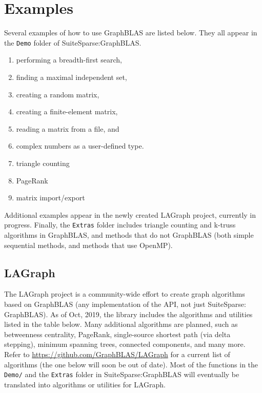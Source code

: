 \documentclass[12pt]{article}
\begin{document}
\newpage
\section{Examples} %
\label{examples}

Several examples of how to use GraphBLAS are listed below.  They all
appear in the \verb'Demo' folder of SuiteSparse:GraphBLAS.

\begin{enumerate}
\item performing a breadth-first search,
\item finding a maximal independent set,
\item creating a random matrix,
\item creating a finite-element matrix,
\item reading a matrix from a file, and
\item complex numbers as a user-defined type.
\item triangle counting
\item PageRank
\item matrix import/export
\end{enumerate}

Additional examples appear in the newly created LAGraph project, currently in
progress.  Finally, the \verb'Extras' folder includes triangle counting and
k-truss algorithms in GraphBLAS, and methods that do not GraphBLAS (both simple
sequential methods, and methods that use OpenMP).

\subsection{LAGraph}
\label{lagraph}

The LAGraph project is a community-wide effort to create graph algorithms based
on GraphBLAS (any implementation of the API, not just SuiteSparse: GraphBLAS).
As of Oct, 2019, the library includes the algorithms and utilities listed in
the table below.  Many additional algorithms are planned, such as betweenness
centrality, PageRank, single-source shortest path (via delta stepping), minimum
spanning trees, connected components, and many more.  Refer to
\url{https://github.com/GraphBLAS/LAGraph} for a current list of algorithms
(the one below will soon be out of date).  Most of the functions in the
\verb'Demo/' and the \verb'Extras' folder in SuiteSparse:GraphBLAS will
eventually be translated into algorithms or utilities for LAGraph.
\end{document}
